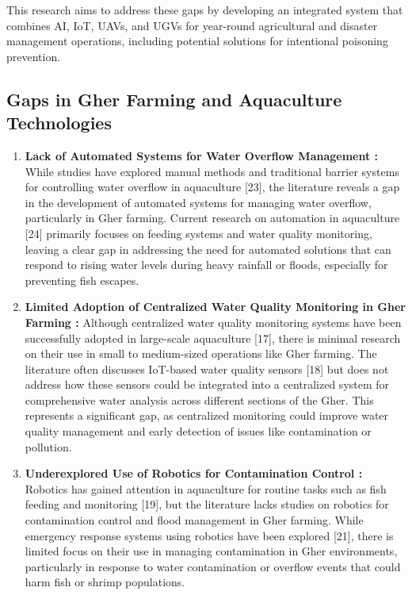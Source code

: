 \documentclass[conference]{IEEEtran}
\begin{document}
This research aims to address these gaps by developing an integrated system that combines AI, IoT, UAVs, and UGVs for year-round agricultural and disaster management operations, including potential solutions for intentional poisoning prevention.

\subsection{ \textbf{Gaps in Gher Farming and Aquaculture Technologies}}
\begin{enumerate}
	\item \textbf{ Lack of Automated Systems for Water Overflow Management : }
	While studies have explored manual methods and traditional barrier systems for controlling water overflow in aquaculture [23], the literature reveals a gap in the development of automated systems for managing water overflow, particularly in Gher farming. Current research on automation in aquaculture [24] primarily focuses on feeding systems and water quality monitoring, leaving a clear gap in addressing the need for automated solutions that can respond to rising water levels during heavy rainfall or floods, especially for preventing fish escapes.
	
	\item \textbf{ Limited Adoption of Centralized Water Quality Monitoring in Gher Farming : }
	Although centralized water quality monitoring systems have been successfully adopted in large-scale aquaculture [17], there is minimal research on their use in small to medium-sized operations like Gher farming. The literature often discusses IoT-based water quality sensors [18] but does not address how these sensors could be integrated into a centralized system for comprehensive water analysis across different sections of the  Gher. This represents a significant gap, as centralized monitoring could improve water quality management and early detection of issues like contamination or pollution.
	
	\item \textbf{Underexplored Use of Robotics for Contamination Control : }
	Robotics has gained attention in aquaculture for routine tasks such as fish feeding and monitoring [19], but the literature lacks studies on robotics for contamination control and flood management in Gher farming. While emergency response systems using robotics have been explored [21], there is limited focus on their use in managing contamination in Gher environments, particularly in response to water contamination or overflow events that could harm fish or shrimp populations.
	

\end{enumerate}
\end{document}
